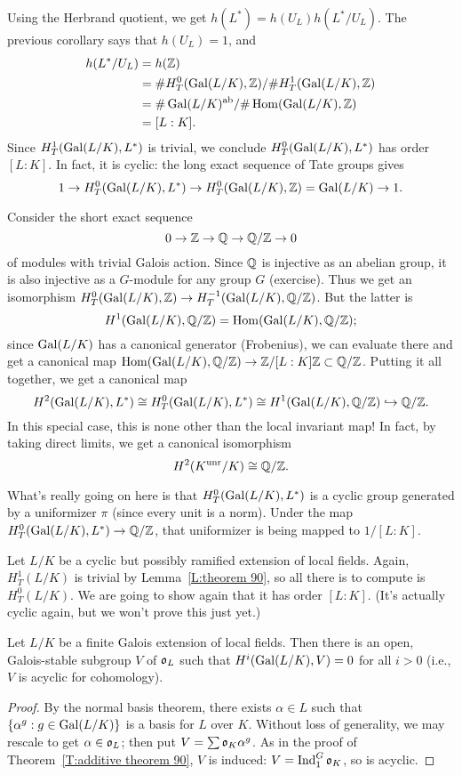 Using the Herbrand quotient, we get
$h(L^*) = h(U_L) h(L^*/U_L)$. The previous corollary says that $h(U_L) = 1$,
and 
\begin{align*}
h(L^*/U_L) &= h(\mathbb{Z}) \\
&= \#H^0_T(\operatorname{Gal}(L/K), \mathbb{Z})/\#H^1_T(\operatorname{Gal}(L/K), \mathbb{Z}) \\
&= \#\operatorname{Gal}(L/K)^{\operatorname{ab}} / \#\operatorname{Hom}(\operatorname{Gal}(L/K), \mathbb{Z}) \\
&= [L:K].
\end{align*}
Since $H^1_T(\operatorname{Gal}(L/K), L^*)$ is trivial, we conclude $H^0_T(\operatorname{Gal}(L/K), L^*)$
has order $[L:K]$. In fact, it is cyclic: the long exact sequence of Tate
groups gives
\[
1 \to
H^0_T(\operatorname{Gal}(L/K), L^*) \to H^0_T(\operatorname{Gal}(L/K), \mathbb{Z}) = \operatorname{Gal}(L/K) \to 1.
\]

Consider the short exact sequence
\[
0 \to \mathbb{Z} \to \mathbb{Q} \to \mathbb{Q}/\mathbb{Z} \to 0
\]
of modules with trivial Galois action. Since $\mathbb{Q}$ is injective as an abelian
group, it is also injective as a $G$-module for any group $G$ (exercise).
Thus we get an isomorphism $H^0_T(\operatorname{Gal}(L/K), \mathbb{Z}) \to H^{-1}_T(\operatorname{Gal}(L/K),
\mathbb{Q}/\mathbb{Z})$. But the latter is
\[
H^1(\operatorname{Gal}(L/K), \mathbb{Q}/\mathbb{Z}) = \operatorname{Hom}(\operatorname{Gal}(L/K),
\mathbb{Q}/\mathbb{Z});
\]
since $\operatorname{Gal}(L/K)$ has a canonical generator (Frobenius), we
can evaluate there and get a canonical map $\operatorname{Hom}(\operatorname{Gal}(L/K), \mathbb{Q}/\mathbb{Z})
\to \mathbb{Z}/[L:K]\mathbb{Z} \subset \mathbb{Q}/\mathbb{Z}$. Putting it all together, we get a 
canonical map
\[
H^2(\operatorname{Gal}(L/K), L^*) \cong H^0_T(\operatorname{Gal}(L/K), L^*)
\cong H^1(\operatorname{Gal}(L/K), \mathbb{Q}/\mathbb{Z}) \hookrightarrow \mathbb{Q}/\mathbb{Z}.
\]
In this special
case, this is none other than the local invariant map! In fact, by
taking direct limits, we get a canonical isomorphism
\[
H^2(K^{\operatorname{unr}}/K) \cong \mathbb{Q}/\mathbb{Z}.
\]

What's really going on here is that $H^0_T(\operatorname{Gal}(L/K), L^*)$ is a cyclic
group generated by a uniformizer $\pi$ (since every unit is a norm).
Under the map $H^0_T(\operatorname{Gal}(L/K), L^*) \to \mathbb{Q}/\mathbb{Z}$, that uniformizer
is being mapped to $1/[L:K]$.


Let $L/K$ be a cyclic but possibly ramified extension of local fields.
Again, $H^1_T(L/K)$ is trivial by Lemma~\ref{L:theorem 90}, so all there is
to compute is $H^0_T(L/K)$. We are going to show again that it
has order $[L:K]$. (It's actually cyclic again, but we won't prove this just
yet.)

\begin{lemma}
Let $L/K$ be a finite Galois extension of local fields. Then there
is an open, Galois-stable subgroup $V$
of $\mathfrak{o}_L$ such that $H^i(\operatorname{Gal}(L/K), V) = 0$ for all $i>0$
(i.e., $V$ is acyclic for cohomology).
\end{lemma}
\begin{proof}
By the normal basis theorem, there exists $\alpha \in L$ such that
$\{\alpha^g: g \in \operatorname{Gal}(L/K)\}$ is a basis for $L$ over $K$. Without loss
of generality, we may rescale to get $\alpha \in \mathfrak{o}_L$; then put
$V = \sum \mathfrak{o}_K \alpha^g$. As in the proof of Theorem~\ref{T:additive theorem 90},
$V$ is induced: $V = \operatorname{Ind}^G_{1} \mathfrak{o}_K$, so is acyclic.
\end{proof}

